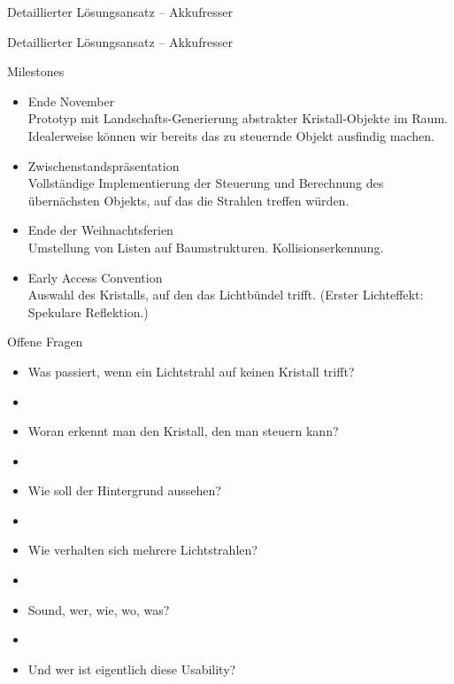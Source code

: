 \begin{frame}
{Detaillierter Lösungsansatz -- Akkufresser}
	
\end{frame}
\begin{frame}
{Detaillierter Lösungsansatz -- Akkufresser}
	
\end{frame}




\begin{frame}{Milestones}
	\begin{itemize}
		
		

		\item \textcolor{evap@lightgreen}{Ende November\\
			Prototyp mit Landschafts-Generierung abstrakter \glqq Kristall\grqq -Objekte im Raum. Idealerweise können wir bereits das zu steuernde Objekt ausfindig machen.}
			
		\item \textcolor{evap@yellow}{Zwischenstandspräsentation\\
			Vollständige Implementierung der Steuerung und Berechnung des übernächsten Objekts, auf das die Strahlen treffen würden.}
			
		\item Ende der Weihnachtsferien\\
			Umstellung von Listen auf Baumstrukturen. Kollisionserkennung.
		\item Early Access Convention\\
			Auswahl des Kristalls, auf den das Lichtbündel trifft. (Erster Lichteffekt: Spekulare Reflektion.)
	\end{itemize}
\end{frame}

\begin{frame}{Offene Fragen}
	\begin{itemize}
		\item Was passiert, wenn ein Lichtstrahl auf keinen Kristall trifft?
		\item[]
		\item Woran erkennt man den Kristall, den man steuern kann?
		\item[]
		\item Wie soll der Hintergrund aussehen?
		\item[]
		\item Wie verhalten sich mehrere Lichtstrahlen?
		\item[]		
		\item Sound, wer, wie, wo, was?
		\item[]		
		\item Und wer ist eigentlich diese Usability?
	\end{itemize}

\end{frame}

%


